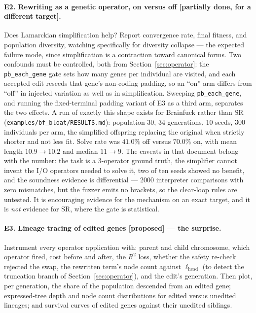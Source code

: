 \documentclass[sigconf]{acmart}
\begin{document}
\paragraph{E2. Rewriting as a genetic operator, on versus off [partially done,
for a different target].} Does Lamarckian simplification help? Report convergence
rate, final fitness, and population diversity, watching specifically for
diversity collapse --- the expected failure mode, since simplification is a
contraction toward canonical forms. Two confounds must be controlled, both from
Section~\ref{sec:operator}: the \texttt{pb\_each\_gene} gate sets how many genes
per individual are visited, and each accepted edit reseeds that gene's non-coding
padding, so an ``on'' arm differs from ``off'' in injected variation as well as in
simplification. Sweeping \texttt{pb\_each\_gene}, and running the fixed-terminal
padding variant of E3 as a third arm, separates the two effects.
A run of exactly this shape exists for Brainfuck rather than SR
(\texttt{examples/bf\_bloat/RESULTS.md}): population 30, 34 generations, 10 seeds,
300 individuals per arm, the simplified offspring replacing the original when
strictly shorter and not less fit. Solve rate was $41.0\%$ off versus $70.0\%$ on,
with mean length $10.9 \to 10.2$ and median $11 \to 9$. The caveats in that
document belong with the number: the task is a 3-operator ground truth, the
simplifier cannot invent the I/O operators needed to solve it, two of ten seeds
showed no benefit, and the soundness evidence is differential --- 2000 interpreter
comparisons with zero mismatches, but the fuzzer emits no brackets, so the
clear-loop rules are untested. It is encouraging evidence for the mechanism on an
exact target, and it is \emph{not} evidence for SR, where the gate is statistical.

\paragraph{E3. Lineage tracing of edited genes [proposed] --- the surprise.}
Instrument every operator application with: parent and child chromosome, which
operator fired, cost before and after, the $R^2$ loss, whether the safety re-check
rejected the swap, the rewritten term's node count against $\ell_{\text{head}}$
(to detect the truncation branch of Section~\ref{sec:operator}), and the edit's
generation. Then plot, per generation, the share of the population descended from
an edited gene; expressed-tree depth and node count distributions for edited
versus unedited lineages; and survival curves of edited genes against their
unedited siblings.
\end{document}
